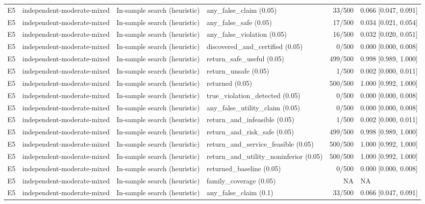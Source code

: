 \begin{longtable}{p{.04\linewidth}p{.18\linewidth}p{.19\linewidth}p{.16\linewidth}r p{.21\linewidth}}
E5 & independent-moderate-mixed & In-sample search (heuristic) & any\_false\_claim (0.05) & 33/500 & 0.066 [0.047, 0.091]\\
E5 & independent-moderate-mixed & In-sample search (heuristic) & any\_false\_safe (0.05) & 17/500 & 0.034 [0.021, 0.054]\\
E5 & independent-moderate-mixed & In-sample search (heuristic) & any\_false\_violation (0.05) & 16/500 & 0.032 [0.020, 0.051]\\
E5 & independent-moderate-mixed & In-sample search (heuristic) & discovered\_and\_certified (0.05) & 0/500 & 0.000 [0.000, 0.008]\\
E5 & independent-moderate-mixed & In-sample search (heuristic) & return\_safe\_useful (0.05) & 499/500 & 0.998 [0.989, 1.000]\\
E5 & independent-moderate-mixed & In-sample search (heuristic) & return\_unsafe (0.05) & 1/500 & 0.002 [0.000, 0.011]\\
E5 & independent-moderate-mixed & In-sample search (heuristic) & returned (0.05) & 500/500 & 1.000 [0.992, 1.000]\\
E5 & independent-moderate-mixed & In-sample search (heuristic) & true\_violation\_detected (0.05) & 0/500 & 0.000 [0.000, 0.008]\\
E5 & independent-moderate-mixed & In-sample search (heuristic) & any\_false\_utility\_claim (0.05) & 0/500 & 0.000 [0.000, 0.008]\\
E5 & independent-moderate-mixed & In-sample search (heuristic) & return\_and\_infeasible (0.05) & 1/500 & 0.002 [0.000, 0.011]\\
E5 & independent-moderate-mixed & In-sample search (heuristic) & return\_and\_risk\_safe (0.05) & 499/500 & 0.998 [0.989, 1.000]\\
E5 & independent-moderate-mixed & In-sample search (heuristic) & return\_and\_service\_feasible (0.05) & 500/500 & 1.000 [0.992, 1.000]\\
E5 & independent-moderate-mixed & In-sample search (heuristic) & return\_and\_utility\_noninferior (0.05) & 500/500 & 1.000 [0.992, 1.000]\\
E5 & independent-moderate-mixed & In-sample search (heuristic) & returned\_baseline (0.05) & 0/500 & 0.000 [0.000, 0.008]\\
E5 & independent-moderate-mixed & In-sample search (heuristic) & family\_coverage (0.05) & NA & NA\\
E5 & independent-moderate-mixed & In-sample search (heuristic) & any\_false\_claim (0.1) & 33/500 & 0.066 [0.047, 0.091]\\

\end{longtable}
